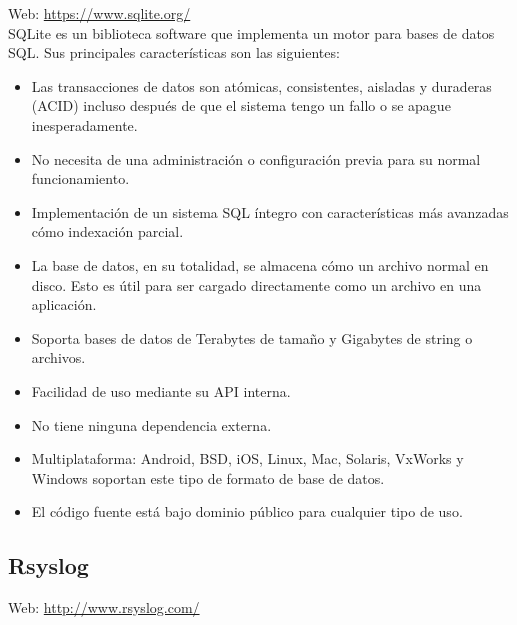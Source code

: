 Web: \url{https://www.sqlite.org/}\\

SQLite es un biblioteca software que implementa un motor para bases de datos SQL. Sus principales características son las siguientes:

\begin{itemize}
\item Las transacciones de datos son atómicas, consistentes, aisladas y duraderas (ACID) incluso después de que el sistema tengo un fallo o se apague inesperadamente.
\item No necesita de una administración o configuración previa para su normal funcionamiento.
\item Implementación de un sistema SQL íntegro con características más avanzadas cómo indexación parcial.
\item La base de datos, en su totalidad, se almacena cómo un archivo normal en disco. Esto es útil para ser cargado directamente como un archivo en una aplicación.
\item Soporta bases de datos de Terabytes de tamaño y Gigabytes de string o archivos.
\item Facilidad de uso mediante su API interna.
\item No tiene ninguna dependencia externa.
\item Multiplataforma: Android, BSD, iOS, Linux, Mac, Solaris, VxWorks y Windows soportan este tipo de formato de base de datos.
\item El código fuente está bajo dominio público para cualquier tipo de uso.
\end{itemize}

\subsection{Rsyslog}

Web: \url{http://www.rsyslog.com/}\\

